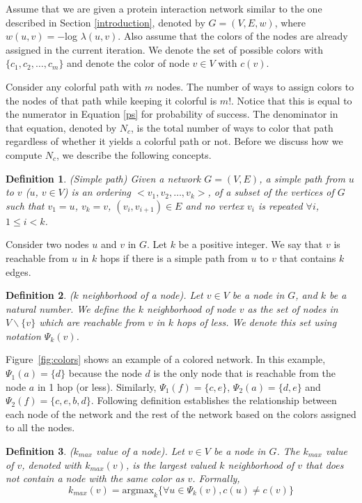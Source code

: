 \documentclass{ws-procs11x85}
\newtheorem{define}{Definition}
\begin{document}
Assume that we are given a protein interaction network similar to the
one described in Section \ref{introduction}, denoted by $G = (V, E,
w)$, where $w(u, v) = -$log $\lambda(u, v)$. Also assume that the
colors of the nodes are already assigned in the current iteration. We
denote the set of possible colors with $\{c_1, c_2, \ldots, c_m\}$
and denote the color of node $v \in V$ with $c(v)$.

Consider any colorful path with $m$ nodes. The number of ways to
assign colors to the nodes of that path while keeping it colorful is
$m!$. Notice that this is equal to the numerator in Equation \ref{ps}
for probability of success. The denominator in that equation, denoted
by $N_c$, is the total number of ways to color that path regardless of
whether it yields a colorful path or not. Before we discuss how we
compute $N_c$, we describe the following concepts.


\begin{define} {\sc (Simple path)}
  Given a network $G=(V,E)$, a {\em simple path} from $u$ to $v$ ($u$,
  $v \in V$) is an ordering $<v_{1},v_{2}, \dots,v_{k}>$, of a subset
  of the vertices of $G$ such that $v_{1}=u$, $v_{k}=v$,
  $(v_{i},v_{i+1}) \in E$ and no vertex $v_{i}$ is repeated $\forall
  i$, $1 \leq i < k$.
\end{define}

Consider two nodes $u$ and $v$ in $G$. Let $k$ be a positive integer.
We say that $v$ is reachable from $u$ in $k$ hops if there is a simple
path from $u$ to $v$ that contains $k$ edges.


\begin{define}
  {\sc ($k$ neighborhood of a node)}. Let $v \in V$ be a node in $G$,
  and $k$ be a natural number.  We define the $k$ neighborhood of node
  $v$ as the set of nodes in $V \backslash \{v\}$ which are reachable
  from $v$ in $k$ hops of less. We denote this set using notation
  $\Psi_k(v)$.
\end{define}

Figure~\ref{fig:colors} shows an example of a colored network.  In
this example, $\Psi_1(a) = \{d\}$ because the node $d$ is the only
node that is reachable from the node $a$ in 1 hop (or less).
Similarly, $\Psi_1(f) = \{c, e\}$, $\Psi_2(a) = \{d, e\}$ and
$\Psi_2(f) = \{c, e, b, d\}$.  Following definition establishes the
relationship between each node of the network and the rest of the
network based on the colors assigned to all the nodes.

\begin{define}
  {\sc ($k_{max}$ value of a node)}. Let $v \in V$ be a node in $G$.
  The $k_{max}$ value of $v$, denoted with $k_{max}(v)$, is the
  largest valued $k$ neighborhood of $v$ that does not contain a node
  with the same color as $v$. Formally, 
$$
k_{max}(v) = \textrm{argmax}_k \{ \forall u \in \Psi_k(v), c(u) \neq c(v)
\}
$$
\label{dfn:kmax:node}
\end{define}
\end{document}
